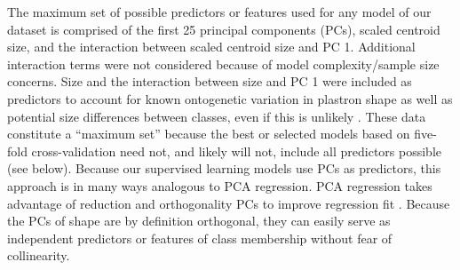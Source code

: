 \documentclass[12pt,letterpaper]{article}
\begin{document}
\begin{table}
  \centering
  \caption{Table of the supervised learning methods used in this analysis.}
  \label{tab:methods}
\end{table}

The maximum set of possible predictors or features used for any model of our dataset is comprised of the first 25 principal components (PCs), scaled centroid size, and the interaction between scaled centroid size and PC 1. Additional interaction terms were not considered because of model complexity/sample size concerns. Size and the interaction between size and PC 1 were included as predictors to account for known ontogenetic variation in plastron shape \citep{Angielczyk2013a} as well as potential size differences between classes, even if this is unlikely \citep{Seeliger1945,Holland1992}. These data constitute a ``maximum set'' because the best or selected models based on five-fold cross-validation need not, and likely will not, include all predictors possible (see below). Because our supervised learning models use PCs as predictors, this approach is in many ways analogous to PCA regression. PCA regression takes advantage of reduction and orthogonality PCs to improve regression fit \citep{Hastie2009}. Because the PCs of shape are by definition orthogonal, they can easily serve as independent predictors or features of class membership without fear of collinearity.
\end{document}
